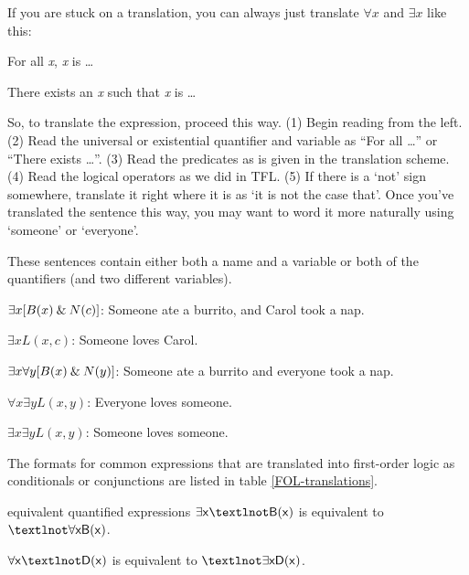 If you are stuck on a translation, you can always just translate $\forall x$ and $\exists x$ like this:
\begin{ebullet}
\item[] For all \textit{x}, \textit{x} is \ldots
\item[] There exists an \textit{x} such that \textit{x} is \ldots
\end{ebullet} 
So, to translate the expression, proceed this way. (1) Begin reading from the left. (2) Read the universal or existential quantifier and variable as ``For all \ldots'' or ``There exists \ldots''. (3) Read the predicates as is given in the translation scheme. (4) Read the logical operators as we did in TFL. (5) If there is a `not' sign somewhere, translate it right where it is as `it is not the case that'. Once you've translated the sentence this way, you may want to word it more naturally using `someone' or `everyone'.

These sentences contain either both a name and a variable or both of the quantifiers (and two different variables).
	
\begin{ebullet}
	\item[]$\exists x[B(x) \mathbin{\&} N(c)]$: Someone ate a burrito, and Carol took a nap.\smallskip
	\item[]$\exists xL(x,c)$: Someone loves Carol.\smallskip
	\item[]$\exists x \forall y[B(x) \mathbin{\&} N(y)]$: Someone ate a burrito and everyone took a nap.\smallskip
	\item[]$\forall x \exists yL(x,y)$: Everyone loves someone.\smallskip
	\item[]$\exists x \exists yL(x,y)$: Someone loves someone.
\end{ebullet}

\noindent The formats for common expressions that are translated into first-order logic as conditionals or conjunctions are listed in table \ref{FOL-translations}. 

\begin{factboxy-width}[width=8cm]{equivalent quantified expressions}
$\exists \meta{x} ¬\meta{B(x)} $ is equivalent to $¬\forall \meta{x B(x)}$.\medskip

$\forall \meta{x} ¬\meta{D(x)}$ is equivalent to $¬\exists \meta{x D(x)}$.
\end{factboxy-width}


